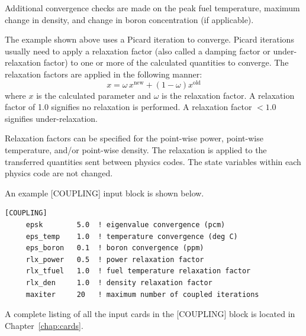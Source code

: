 Additional convergence checks are made on the peak fuel temperature, maximum change in density,
and change in boron concentration (if applicable).

The example shown above uses a Picard iteration to converge.  Picard iterations usually
need to apply a relaxation factor (also called a damping factor or under-relaxation factor) to
one or more of the calculated quantities to converge.
The relaxation factors are applied in the following manner:
\begin{equation}
  x = \omega \, x^{\mbox{new}} + (1 - \omega) x^{\mbox{old}}
\end{equation}
where $x$ is the calculated parameter and $\omega$ is the relaxation factor.
A relaxation factor of 1.0 signifies no relaxation is performed.
A relaxation factor $< 1.0$ signifies under-relaxation.

Relaxation factors can be specified for the point-wise power, point-wise temperature, and/or point-wise density.
The relaxation is applied to the transferred quantities sent between physics codes.  The state variables
within each physics code are not changed.

An example [COUPLING] input block is shown below.

\begin{Verbatim}[fontsize=\small]
   [COUPLING]
     epsk        5.0  ! eigenvalue convergence (pcm)
     eps_temp    1.0  ! temperature convergence (deg C)
     eps_boron   0.1  ! boron convergence (ppm)
     rlx_power   0.5  ! power relaxation factor
     rlx_tfuel   1.0  ! fuel temperature relaxation factor
     rlx_den     1.0  ! density relaxation factor
     maxiter     20   ! maximum number of coupled iterations
\end{Verbatim}

A complete listing of all the input cards in the [COUPLING] block is located in Chapter~\ref{chap:cards}.

